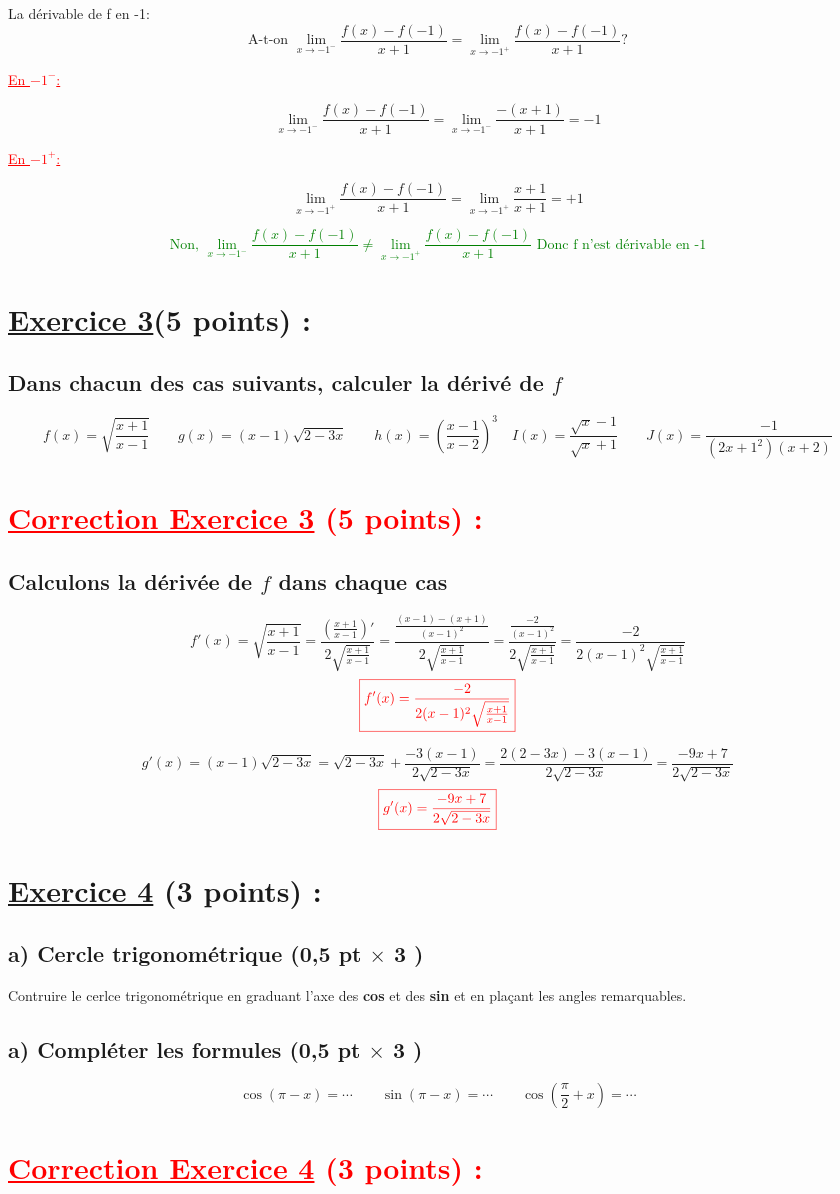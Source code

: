 \documentclass[12pt]{article}
\begin{document}
La dérivable de f en -1:
\[\text{A-t-on }\lim_{x \to -1^{-}}\frac{f(x)-f(-1)}{x+1}=\lim_{x \to -1^{+}}\frac{f(x)-f(-1)}{x+1}?\]

\textcolor{red}{\underline{En $-1^{-}$:}}

\[\lim_{x \to -1^{-}}\frac{f(x)-f(-1)}{x+1}=\lim_{x \to -1^{-}}\frac{-(x+1)}{x+1}=-1\]

\textcolor{red}{\underline{En $-1^{+}$:}}

\[\lim_{x \to -1^{+}}\frac{f(x)-f(-1)}{x+1}=\lim_{x \to -1^{+}}\frac{x+1}{x+1}=+1\]

\textcolor{green}{\[\text{Non, }\lim_{x \to -1^{-}}\frac{f(x)-f(-1)}{x+1}\neq\lim_{x \to -1^{+}}\frac{f(x)-f(-1)}{x+1}\text{ Donc f n'est dérivable en -1}\]}
\section*{\underline{Exercice 3}(5 points) :}
\subsection*{ Dans chacun des cas suivants, calculer la dérivé de $f$}
\[
f(x)=\sqrt{\frac{x+1}{x-1}}\quad\quad g(x)=(x-1)\sqrt{2-3x}\quad\quad h(x)=(\frac{x-1}{x-2})^{3}\quad I(x)=\frac{\sqrt{x}-1}{\sqrt{x}+1}\quad\quad J(x)=\frac{-1}{(2x+1^{2})(x+2)}
\]
\section*{\textcolor{red}{\underline{Correction Exercice 3} (5 points) :}}
\subsection*{ Calculons la dérivée de $f$ dans chaque cas}
\[
f'(x)=\sqrt{\frac{x+1}{x-1}}=\frac{(\frac{x+1}{x-1})'}{2\sqrt{\frac{x+1}{x-1}}}=\frac{\frac{(x-1)-(x+1)}{(x-1)^{2}}}{2\sqrt{\frac{x+1}{x-1}}}=\frac{\frac{-2}{(x-1)^{2}}}{2\sqrt{\frac{x+1}{x-1}}}=\frac{-2}{2(x-1)^{2}\sqrt{\frac{x+1}{x-1}}}
\]
\[\textcolor{red}{\boxed{f'(x)=\frac{-2}{2(x-1)^{2}\sqrt{\frac{x+1}{x-1}}}}}\]

\[g'(x)=(x-1)\sqrt{2-3x}=\sqrt{2-3x}+\frac{-3(x-1)}{2\sqrt{2-3x}}=\frac{2(2-3x)-3(x-1)}{2\sqrt{2-3x}}=\frac{-9x+7}{2\sqrt{2-3x}}\]
\[\textcolor{red}{\boxed{g'(x)=\frac{-9x+7}{2\sqrt{2-3x}}}}\]
\section*{\underline{Exercice 4} (3 points) :}
\subsection*{a) Cercle trigonométrique (0,5 pt $\times$ 3 )}
Contruire le cerlce trigonométrique en graduant l'axe des \textbf{cos} et des 
\textbf{sin} et en plaçant les angles remarquables.
\subsection*{a) Compléter les formules (0,5 pt $\times$ 3 )}
\[\cos(\pi-x)=\cdots\quad\quad \sin(\pi-x)=\cdots\quad\quad \cos(\frac{\pi}{2}+x)=\cdots\]
\section*{\textcolor{red}{\underline{Correction Exercice 4} (3 points) :}}
\end{document}
